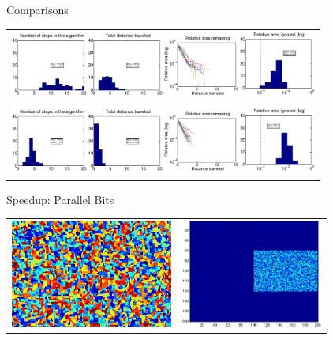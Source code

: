 \begin{tframe}{Comparisons}
\begin{center}
\begin{tabular}{c}
\includegraphics[width=4in]{media_exploration/simple_cropped}\\
\includegraphics[width=4in]{media_exploration/ising_cropped}
\end{tabular}
\end{center}
\end{tframe}

\begin{tframe}{Speedup: Parallel Bits}

\bigskip
\begin{center}
\begin{tabular}{cc}
\includegraphics[height=1.4in]{media_exploration/iso-01}&
\includegraphics[height=1.4in]{media_exploration/par000}
\end{tabular}
\end{center}
\end{tframe}

